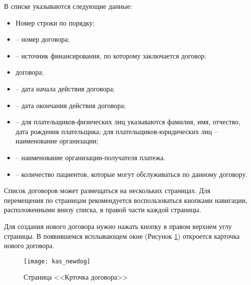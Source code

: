В списке указываются следующие данные:
\begin{itemize}
 \item Номер строки по порядку;
 \item {} -- номер договора;
 \item {} -- источник финансирования, по которому заключается договор;
 \item {} договора;
 \item {} -- дата начала действия договора;
 \item {} -- дата окончания действия договора;
 \item {} -- для плательщиков-физических лиц указываются фамилия, имя, отчество, дата рождения плательщика; для плательщиков-юридических лиц -- наименование организации;
 \item {} -- наименование организации-получателя платежа.
 \item {} -- количество пациентов, которые могут обслуживаться по данному договору.
\end{itemize}

Список договоров может размещаться на нескольких страницах. Для перемещения по страницам рекомендуется воспользоваться кнопками навигации, расположенными внизу списка, в правой части каждой страницы.

Для создания нового договора нужно нажать кнопку  в правом верхнем углу страницы. В появившемся всплывающем окне (Рисунок \ref{img_kas_newdog}) откроется карточка нового договора.
 
\begin{figure}[!ht]\centering
	\texttt{[image: kas\_newdog]}
	\caption{Страница <<Крточка договора>>}
	\label{img_kas_newdog}
\end{figure}

